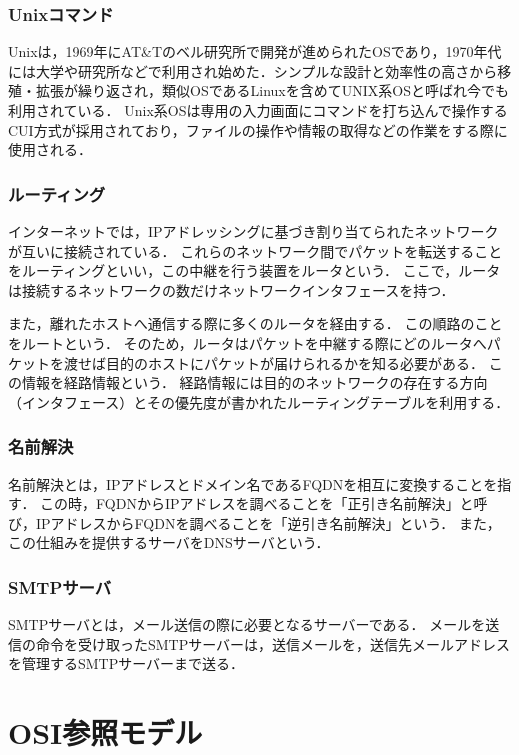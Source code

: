 \documentclass[12pt,a4j,titlepage]{ltjsarticle}
\begin{document}
\subsubsection{Unixコマンド}
Unixは，1969年にAT\&Tのベル研究所で開発が進められたOSであり，1970年代には大学や研究所などで利用され始めた．シンプルな設計と効率性の高さから移殖・拡張が繰り返され，類似OSであるLinuxを含めてUNIX系OSと呼ばれ今でも利用されている．
Unix系OSは専用の入力画面にコマンドを打ち込んで操作するCUI方式が採用されており，ファイルの操作や情報の取得などの作業をする際に使用される．


\subsubsection{ルーティング}
インターネットでは，IPアドレッシングに基づき割り当てられたネットワークが互いに接続されている．
これらのネットワーク間でパケットを転送することをルーティングといい，この中継を行う装置をルータという．
ここで，ルータは接続するネットワークの数だけネットワークインタフェースを持つ．

また，離れたホストへ通信する際に多くのルータを経由する．
この順路のことをルートという．
そのため，ルータはパケットを中継する際にどのルータへパケットを渡せば目的のホストにパケットが届けられるかを知る必要がある．
この情報を経路情報という．
経路情報には目的のネットワークの存在する方向（インタフェース）とその優先度が書かれたルーティングテーブルを利用する．

\subsubsection{名前解決}
名前解決とは，IPアドレスとドメイン名であるFQDNを相互に変換することを指す．
この時，FQDNからIPアドレスを調べることを「正引き名前解決」と呼び，IPアドレスからFQDNを調べることを「逆引き名前解決」という．
また，この仕組みを提供するサーバをDNSサーバという．

\subsubsection{SMTPサーバ}
SMTPサーバとは，メール送信の際に必要となるサーバーである．
メールを送信の命令を受け取ったSMTPサーバーは，送信メールを，送信先メールアドレスを管理するSMTPサーバーまで送る．




\section{OSI参照モデル}
\end{document}
